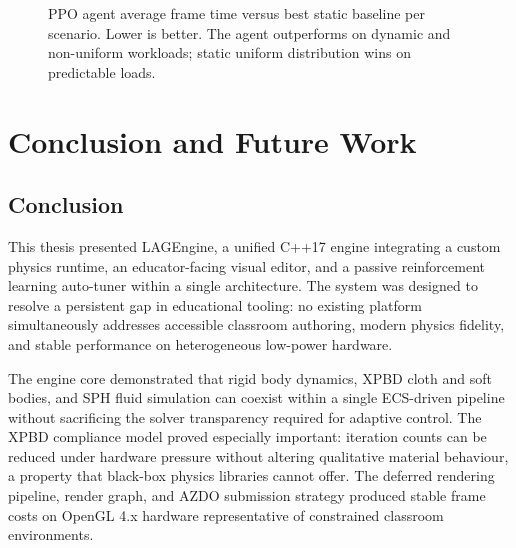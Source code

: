 \documentclass[9pt,openany]{extbook}
\begin{document}
\begin{figure}[H]
\centering
{}
\caption{PPO agent average frame time versus best static baseline per
         scenario. Lower is better. The agent outperforms on dynamic and
         non-uniform workloads; static uniform distribution wins on
         predictable loads.}
\label{fig:rl_barchart}
\end{figure}

\chapter{Conclusion and Future Work}
\label{chap:conclusion}

\section{Conclusion}

This thesis presented LAGEngine, a unified C++17 engine integrating a custom
physics runtime, an educator-facing visual editor, and a passive reinforcement
learning auto-tuner within a single architecture.  The system was designed to
resolve a persistent gap in educational tooling: no existing platform
simultaneously addresses accessible classroom authoring, modern physics
fidelity, and stable performance on heterogeneous low-power hardware.

The engine core demonstrated that rigid body dynamics, XPBD cloth and soft
bodies, and SPH fluid simulation can coexist within a single ECS-driven
pipeline without sacrificing the solver transparency required for adaptive
control.  The XPBD compliance model proved especially important: iteration
counts can be reduced under hardware pressure without altering qualitative
material behaviour, a property that black-box physics libraries cannot
offer.  The deferred rendering pipeline, render graph, and AZDO submission
strategy produced stable frame costs on OpenGL 4.x hardware representative
of constrained classroom environments.
\end{document}
